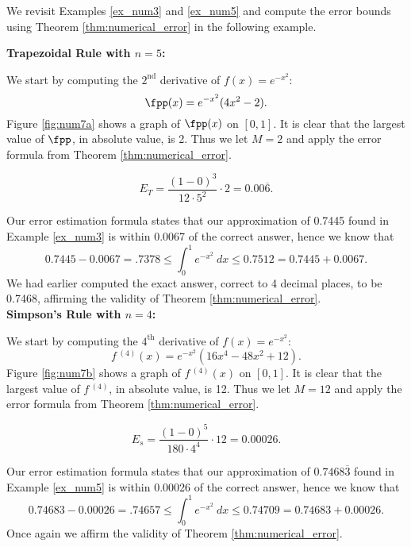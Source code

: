 We revisit Examples \ref{ex_num3} and \ref{ex_num5} and compute the error bounds using Theorem \ref{thm:numerical_error} in the following example.\\

{

\noindent \textbf{Trapezoidal Rule with $n=5$:}


We start by computing the $2^\text{nd}$ derivative of $f(x) = e^{-x^2}$: $$\fpp(x) = e^{-x^2}(4x^2-2).$$ Figure \ref{fig:num7a} shows a graph of $\fpp(x)$ on $[0,1]$. It is clear that the largest value of $\fpp$, in absolute value, is 2. Thus we let $M=2$ and apply the error formula from Theorem \ref{thm:numerical_error}.

$$E_T = \frac{(1-0)^3}{12\cdot 5^2}\cdot 2 = 0.00\overline{6}.$$

Our error estimation formula states that our approximation of 0.7445 found in Example \ref{ex_num3} is within 0.0067 of the correct answer, hence we know that
$$0.7445-0.0067 = .7378 \leq \int_0^1e^{-x^2}\ dx \leq 0.7512 = 0.7445 + 0.0067.$$ We had earlier computed the exact answer, correct to 4 decimal places, to be 0.7468, affirming the validity of Theorem \ref{thm:numerical_error}.\\

\noindent\textbf{Simpson's Rule with $n=4$:}


We start by computing the $4^\text{th}$ derivative of $f(x) = e^{-x^2}$: $$f\,^{(4)}(x) = e^{-x^2}(16x^4-48x^2+12).$$ Figure \ref{fig:num7b} shows a graph of $f\,^{(4)}(x)$ on $[0,1]$. It is clear that the largest value of $f\,^{(4)}$, in absolute value, is 12. Thus we let $M=12$ and apply the error formula from Theorem \ref{thm:numerical_error}.

$$E_s = \frac{(1-0)^5}{180\cdot 4^4}\cdot 12 = 0.00026.$$

\enlargethispage{2\baselineskip}

Our error estimation formula states that our approximation of $0.7468\overline{3}$ found in Example \ref{ex_num5} is within 0.00026 of the correct answer, hence we know that
$$0.74683-0.00026 = .74657 \leq \int_0^1e^{-x^2}\ dx \leq 0.74709 = 0.74683 + 0.00026.$$ Once again we affirm the validity of Theorem \ref{thm:numerical_error}.
}\\

